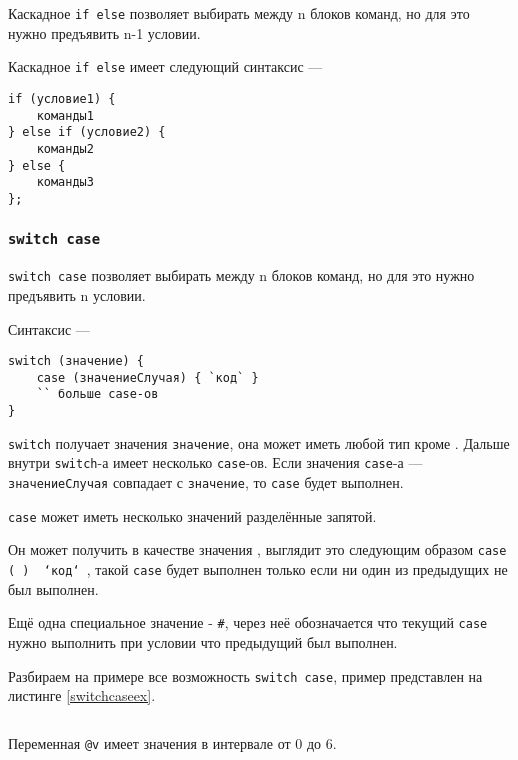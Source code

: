Каскадное \texttt{if else} позволяет выбирать между n блоков команд, но для это нужно предъявить n-1 условии.

Каскадное \texttt{if else} имеет следующий синтаксис —
\begin{verbatim}
if (условие1) {
	команды1
} else if (условие2) {
	команды2
} else {
	команды3
};
\end{verbatim}

\subsubsection{\texttt{switch case}}

\texttt{switch case} позволяет выбирать между n блоков команд, но для это нужно предъявить n условии.

Синтаксис —
\begin{verbatim}
switch (значение) {
	case (значениеСлучая) { `код` }
	`` больше case-ов
}
\end{verbatim}

\texttt{switch} получает значения \texttt{значение}, она может иметь любой тип кроме \bool. Дальше внутри \texttt{switch}-а имеет несколько \texttt{case}-ов. Если значения \texttt{case}-а — \texttt{значениеСлучая} совпадает с \texttt{значение}, то \texttt{case} будет выполнен.

\texttt{case} может иметь несколько значений разделённые запятой.

Он может получить в качестве значения \void, выглядит это следующим образом \texttt{case (~) { `код` }}, такой \texttt{case} будет выполнен только если ни один из предыдущих не был выполнен.

Ещё одна специальное значение - \texttt{#}, через неё обозначается что текущий \texttt{case} нужно выполнить при условии что предыдущий был выполнен.

Разбираем на примере все возможность \texttt{switch case}, пример представлен на листинге \ref{switchcaseex}.

\begin{sourcecode}
	\label{switchcaseex}
    \inputminted[linenos]{icl}{../sources/switchcaseex.icL}
\end{sourcecode}

Переменная \texttt{@v} имеет значения в интервале от 0 до 6.

